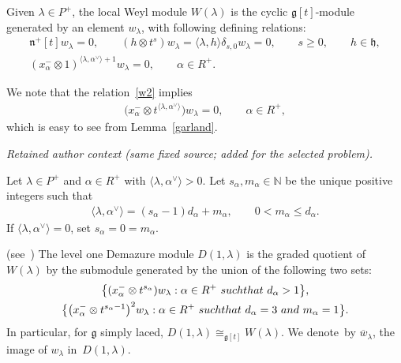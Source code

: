 \documentclass[10pt,a4paper]{amsart}
\begin{document}
\begin{definition}
Given $\lambda \in P^+$, the local Weyl module $W(\lambda)$ is the cyclic $\mathfrak{g}[t]$-module generated by an
element $w_\lambda$, with following def\/ining relations:
\begin{gather}
\mathfrak{n}^{+}[t]  w_\lambda=0,
\qquad
(h \otimes t^s)  w_\lambda = \langle \lambda, h \rangle \delta_{s,0} w_\lambda=0,
\qquad
s\geq0,
\qquad
h\in\mathfrak{h},
\nonumber
\\
(x^{-}_\alpha \otimes 1)^{\langle \lambda,
\alpha^{\vee} \rangle + 1}w_\lambda=0,
\qquad
\alpha \in R^{+}.
\label{w2}
\end{gather}
\end{definition}
\noindent We note that the relation~\eqref{w2} implies
\begin{gather}
\label{w2'}
\big(x^{-}_\alpha \otimes t^{\langle \lambda,
\alpha^{\vee} \rangle}\big)  w_\lambda=0,
\qquad
\alpha \in R^{+},
\end{gather}
which is easy to see from Lemma~\ref{garland}.

\par\medskip\noindent\textit{Retained author context (same fixed source; added for the selected problem).}\par
Let $\lambda\in P^{+}$ and $\alpha\in R^{+}$ with $\langle \lambda, \alpha^{\vee}\rangle > 0$.
Let $s_\alpha, m_\alpha \in \mathbb{N}$ be the unique positive integers such that
\begin{gather*}
\langle \lambda, \alpha^{\vee}\rangle = (s_\alpha-1)d_\alpha + m_\alpha,
\qquad
0<m_\alpha\leq d_\alpha.
\end{gather*}
If $\langle \lambda, \alpha^{\vee}\rangle = 0$, set $s_\alpha=0=m_\alpha$.

\begin{definition}
\textup{(see~\cite[Corollary 3.5]{CV})} The level one Demazure module $D(1,\lambda)$ is the graded quotient of
$W(\lambda)$ by the submodule generated by the union of the following two sets:
\begin{gather}
\big\{(x^{-}_{\alpha} \otimes t^{s_{\alpha}})  w_{\lambda}: \alpha\in R^{+}~\textup{such that}~d_{\alpha} > 1\big\},
\label{dm1}
\\
\big\{\big(x^{-}_{\alpha} \otimes t^{s_{\alpha}-1}\big)^2  w_{\lambda}: \alpha\in R^{+}~\textup{such that}~d_\alpha =3~\textup{and}~m_\alpha=1\big\}.
\label{dm2}
\end{gather}
In particular, for $\mathfrak{g}$ simply laced, $D(1,\lambda)\cong_{\mathfrak{g}[t]} W(\lambda)$. We denote~by
$\overline{w}_\lambda$, the image of $w_\lambda$ in~$D(1,\lambda)$.
\end{definition}
\end{document}

